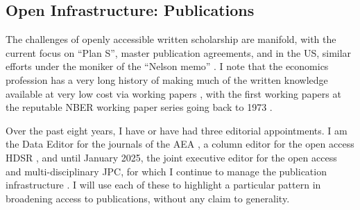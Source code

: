 \documentclass{Revue-economique}
\newcommand{\citep}{\parencite}
\begin{document}
\begin{Article} [%
	Titre={Reproducibility and Open Science in Economics},
	Auteur={Lars Vilhuber\thanks{Cornell University, lars.vilhuber@cornell.edu}}]
\begin{refsection}[Main]
%


\section{Open Infrastructure: Publications}
\label{sec:publications}

The challenges of openly accessible written scholarship are manifold, with the current focus on ``Plan S'', master publication agreements, and in the US, similar efforts under the moniker of the ``Nelson memo'' \parencite{brainard_white_2022,brainard_us_2024}. I note that the economics profession has a very long history of making much of the written knowledge available at very low cost via working papers \parencite{vilhuber_reproducibility_2020}, with the first working papers at the reputable NBER working paper series going back to 1973 \parencite{welch_education_1973}.

Over the past eight years, I have or have had three editorial appointments. I am the Data Editor for the journals of the \acf{AEA} \citep{10.1257/pandp.108.745},  a column editor for the open access \ac{HDSR} \citep{vilhuberReinforcingReproducibilityReplicability2023}, and until January 2025, the joint executive editor for the open access and multi-disciplinary \ac{JPC}, for which I continue to manage the publication infrastructure \citep{abowd_changes_2025}. I will use each of these to highlight a particular pattern in broadening access to publications, without any claim to generality. 


\end{refsection}
\end{Article}
\end{document}
